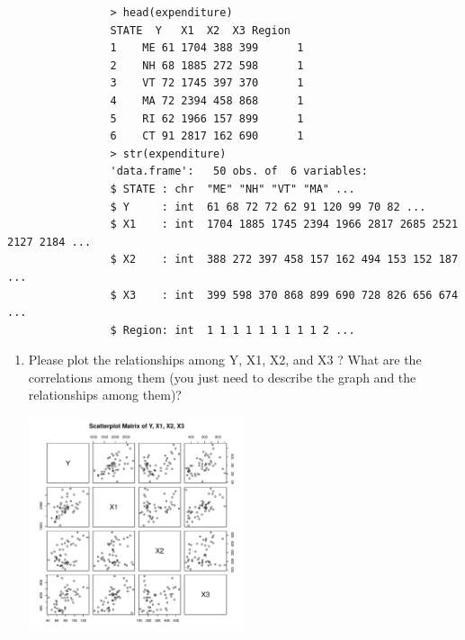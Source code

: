 \documentclass[12pt,letterpaper]{article}
\begin{document}
		\begin{verbatim}
				> head(expenditure)
				STATE  Y   X1  X2  X3 Region
				1    ME 61 1704 388 399      1
				2    NH 68 1885 272 598      1
				3    VT 72 1745 397 370      1
				4    MA 72 2394 458 868      1
				5    RI 62 1966 157 899      1
				6    CT 91 2817 162 690      1
				> str(expenditure)
				'data.frame':	50 obs. of  6 variables:
				$ STATE : chr  "ME" "NH" "VT" "MA" ...
				$ Y     : int  61 68 72 72 62 91 120 99 70 82 ...
				$ X1    : int  1704 1885 1745 2394 1966 2817 2685 2521 2127 2184 ...
				$ X2    : int  388 272 397 458 157 162 494 153 152 187 ...
				$ X3    : int  399 598 370 868 899 690 728 826 656 674 ...
				$ Region: int  1 1 1 1 1 1 1 1 1 2 ...
		\end{verbatim}
					\vspace{.5cm}
\begin{enumerate}
	\item Please plot the relationships among Y, X1, X2, and X3 ? What are the correlations among them (you just need to describe the graph and the relationships among them)?\\


					\vspace{.5cm}
					
  

\begin{center}
	\includegraphics[width=0.5\textwidth]{Plot_Matrix.pdf}
\end{center}


\end{enumerate}
\end{document}
